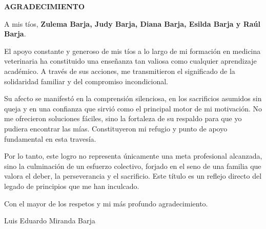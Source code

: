 \clearpage


\begin{center}
	\textbf{AGRADECIMIENTO}
\end{center}
A mis tíos, \textbf{Zulema Barja, Judy Barja, Diana Barja, Esilda Barja y Raúl Barja}.

El apoyo constante y generoso de mis tíos a lo largo de mi formación en medicina veterinaria ha constituido una enseñanza tan valiosa como cualquier aprendizaje académico. A través de sus acciones, me transmitieron el significado de la solidaridad familiar y del compromiso incondicional.

Su afecto se manifestó en la comprensión silenciosa, en los sacrificios asumidos sin queja y en una confianza que sirvió como el principal motor de mi motivación. No me ofrecieron soluciones fáciles, sino la fortaleza de su respaldo para que yo pudiera encontrar las mías. Constituyeron mi refugio y punto de apoyo fundamental en esta travesía.

Por lo tanto, este logro no representa únicamente una meta profesional alcanzada, sino la culminación de un esfuerzo colectivo, forjado en el seno de una familia que valora el deber, la perseverancia y el sacrificio. Este título es un reflejo directo del legado de principios que me han inculcado.

Con el mayor de los respetos y mi más profundo agradecimiento.
\begin{center}
	Luis Eduardo Miranda Barja
\end{center}
